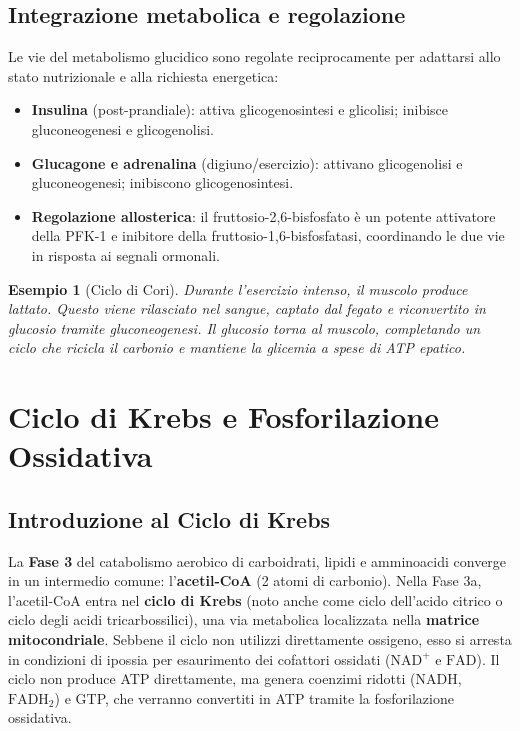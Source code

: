 \documentclass[12pt,a4paper]{report}
\newtheorem{esempio}{Esempio}[section]
\begin{document}
\section{Integrazione metabolica e regolazione}
Le vie del metabolismo glucidico sono regolate reciprocamente per adattarsi allo stato nutrizionale e alla richiesta energetica:
\begin{itemize}
\item \textbf{Insulina} (post-prandiale): attiva glicogenosintesi e glicolisi; inibisce gluconeogenesi e glicogenolisi.
\item \textbf{Glucagone e adrenalina} (digiuno/esercizio): attivano glicogenolisi e gluconeogenesi; inibiscono glicogenosintesi.
\item \textbf{Regolazione allosterica}: il fruttosio-2,6-bisfosfato è un potente attivatore della PFK-1 e inibitore della fruttosio-1,6-bisfosfatasi, coordinando le due vie in risposta ai segnali ormonali.
\end{itemize}
\begin{esempio}[Ciclo di Cori]
Durante l'esercizio intenso, il muscolo produce lattato. Questo viene rilasciato nel sangue, captato dal fegato e riconvertito in glucosio tramite gluconeogenesi. Il glucosio torna al muscolo, completando un ciclo che ricicla il carbonio e mantiene la glicemia a spese di ATP epatico.
\end{esempio}

\chapter{Ciclo di Krebs e Fosforilazione Ossidativa}
\section{Introduzione al Ciclo di Krebs}
La \textbf{Fase 3} del catabolismo aerobico di carboidrati, lipidi e amminoacidi converge in un intermedio comune: l'\textbf{acetil-CoA} (2 atomi di carbonio). Nella Fase 3a, l'acetil-CoA entra nel \textbf{ciclo di Krebs} (noto anche come ciclo dell'acido citrico o ciclo degli acidi tricarbossilici), una via metabolica localizzata nella \textbf{matrice mitocondriale}.
Sebbene il ciclo non utilizzi direttamente ossigeno, esso si arresta in condizioni di ipossia per esaurimento dei cofattori ossidati (\(\mathrm{NAD^+}\) e \(\mathrm{FAD}\)). Il ciclo non produce ATP direttamente, ma genera coenzimi ridotti (\(\mathrm{NADH}\), \(\mathrm{FADH_2}\)) e GTP, che verranno convertiti in ATP tramite la fosforilazione ossidativa.
\end{document}
